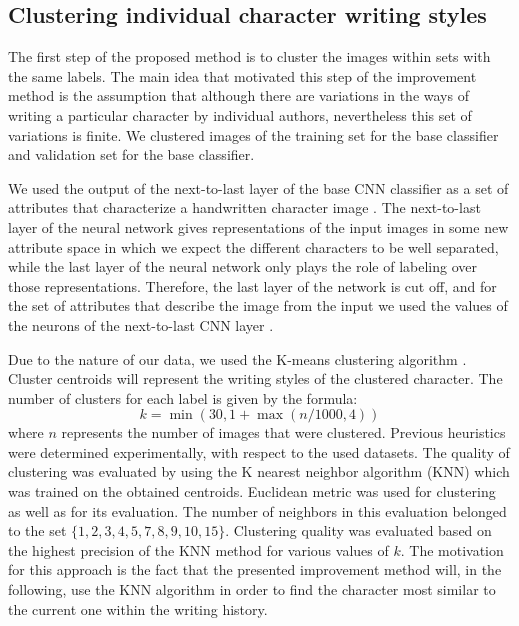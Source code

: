 \documentclass{article}
\begin{document}
\subsection{Clustering individual character writing styles}

The first step of the proposed method is to cluster the images within sets with the same labels.
The main idea that motivated this step of the improvement method is the assumption that although there are variations in the ways of writing a particular character by individual authors, nevertheless this set of variations is finite.
We clustered images of the training set for the base classifier and validation set for the base classifier.

We used the output of the next-to-last layer of the base CNN classifier as a set of attributes that characterize a handwritten character image \citet{nexttolast}.
The next-to-last layer of the neural network gives representations of the input images in some new attribute space in which we expect the different characters to be well separated,
while the last layer of the neural network only plays the role of labeling over those representations.
Therefore, the last layer of the network is cut off, and for the set of attributes that describe the image from the input we used the values of the neurons of the next-to-last CNN layer \citet{style1} \citet{style2}.

Due to the nature of our data, we used the K-means clustering algorithm \citet{kmeans}.
Cluster centroids will represent the writing styles of the clustered character.
The number of clusters for each label is given by the formula:
\begin{equation}
  k = \min(30, 1+\max(n/1000, 4))
\end{equation}
where $n$ represents the number of images that were clustered.
Previous heuristics were determined experimentally, with respect to the used datasets.
The quality of clustering was evaluated by using the K nearest neighbor algorithm (KNN) which was trained on the obtained centroids.
Euclidean metric was used for clustering as well as for its evaluation.
The number of neighbors in this evaluation belonged to the set $\{1,2,3,4,5,7,8,9,10,15\}$.
Clustering quality was evaluated based on the highest precision of the KNN method for various values of $k$.
The motivation for this approach is the fact that the presented improvement method will, in the following, use the KNN algorithm in order to find the character most similar to the current one within the writing history.
\end{document}
